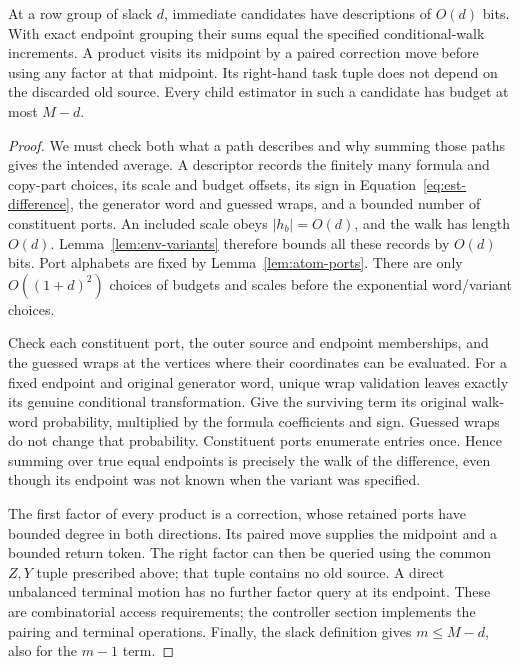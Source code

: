 \begin{lemma}\label{lem:est-paths}
At a row group of slack $d$, immediate candidates have descriptions of
$O(d)$ bits.  With exact endpoint grouping their sums equal the specified
conditional-walk increments.  A product visits its midpoint by a paired
correction move before using any factor at that midpoint.  Its right-hand
task tuple does not depend on the discarded old source.  Every child
estimator in such a candidate has budget at most $M-d$.
\end{lemma}
\begin{proof}
We must check both what a path describes and why summing those paths gives the intended average. A descriptor records the finitely many formula and copy-part choices, its
scale and budget offsets, its sign in Equation~\eqref{eq:est-difference},
the generator word and guessed wraps, and a bounded number of constituent
ports.  An included scale obeys $|h_b|=O(d)$, and the walk has length
$O(d)$.  Lemma~\ref{lem:env-variants} therefore bounds all these records by
$O(d)$ bits.  Port alphabets are fixed by Lemma~\ref{lem:atom-ports}.
There are only $O((1+d)^2)$ choices of budgets and scales before the
exponential word/variant choices.

Check each constituent port, the outer source and endpoint memberships,
and the guessed wraps at the vertices where their coordinates can be
evaluated.  For a fixed endpoint and original generator word, unique wrap
validation leaves exactly its genuine conditional transformation.
Give the surviving term its original walk-word probability, multiplied
by the formula coefficients and sign.  Guessed wraps do not change that
probability.  Constituent ports enumerate entries once.  Hence summing
over true equal endpoints is precisely the walk of the difference, even
though its endpoint was not known when the variant was specified.

The first factor of every product is a correction, whose retained ports
have bounded degree in both directions.  Its paired move supplies the
midpoint and a bounded return token.  The right factor can then be queried
using the common $Z,Y$ tuple prescribed above; that tuple contains no old
source.  A direct unbalanced terminal motion has no further factor query
at its endpoint.  These are combinatorial access requirements; the
controller section implements the pairing and terminal operations.
Finally, the slack definition gives $m\le M-d$, also for the $m-1$ term.
\end{proof}


